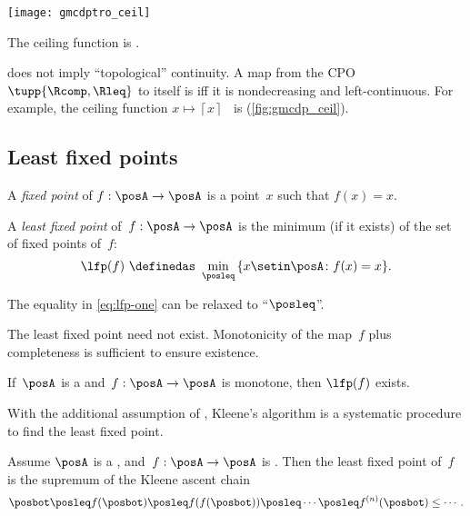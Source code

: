 \begin{marginfigure}
    \texttt{[image: gmcdptro\_ceil]}
    \caption{The ceiling function is \scottcontinuous.}
    \label{fig:gmcdp_ceil}
\end{marginfigure}

\begin{remark}
    \scottcontinuity does not imply ``topological'' continuity.
    A map from the CPO $\tupp{\Rcomp,\Rleq}$ to itself is \scottcontinuous iff it is nondecreasing and left-continuous.
    For example, the ceiling function $x\mapsto\left\lceil x\right\rceil $~ is \scottcontinuous (\cref{fig:gmcdp_ceil}).
\end{remark}

\subsection{Least fixed points}

\begin{definition}
    \label{def:least-fixed}
    A \emph{fixed point} of $f:\posA\to\posA$ is a point~$x$ such that $f(x)=x$.

    A \emph{least fixed point} of~$f:\posA\to\posA$ is the minimum (if it exists) of the set of fixed points of~$f$:
    \begin{equation}
        \label{eq:lfp-one}
        \lfp(f)\,\,\definedas\,\,\min_{\posleq}\,\{x\setin\posA\colon f(x)=x\}.
    \end{equation}

    The equality in \cref{eq:lfp-one} can be relaxed to ``$\posleq$''.
\end{definition}

The least fixed point need not exist.
Monotonicity of the map~$f$ plus completeness is sufficient to ensure existence.

\begin{lemma}
    \label{lem:CPO-fix-point-2}
    If~$\posA$ is a \CPO and~$f:\posA\rightarrow\posA$
    is monotone, then $\lfp(f)$ exists.
\end{lemma}

With the additional assumption of \scottcontinuity, Kleene's algorithm is a systematic procedure to find the least fixed point.

\begin{lemma}
    \label{lem:kleene-1}
    Assume $\posA$ is a \CPO, and~$f:\posA\rightarrow\posA$ is \scottcontinuous.
    Then the least fixed point of~$f$ is the supremum of the Kleene ascent chain
    \begin{equation*}
        \posbot\posleq f(\posbot)\posleq f(f(\posbot))\posleq\cdots\posleq f^{(n)}(\posbot)\leq\cdots.
    \end{equation*}
\end{lemma}
